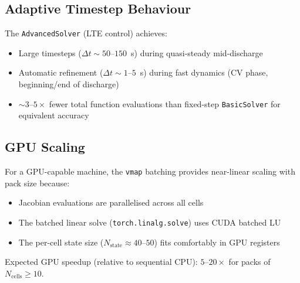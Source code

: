 \subsection{Adaptive Timestep Behaviour}

The \texttt{AdvancedSolver} (LTE control) achieves:
\begin{itemize}
  \item Large timesteps ($\Delta t \sim 50$--$150$~s) during quasi-steady mid-discharge
  \item Automatic refinement ($\Delta t \sim 1$--$5$~s) during fast dynamics (CV phase, beginning/end of discharge)
  \item $\sim 3$--$5\times$ fewer total function evaluations than fixed-step \texttt{BasicSolver} for equivalent accuracy
\end{itemize}

\subsection{GPU Scaling}

For a GPU-capable machine, the \texttt{vmap} batching provides near-linear scaling with pack size because:
\begin{itemize}
  \item Jacobian evaluations are parallelised across all cells
  \item The batched linear solve (\texttt{torch.linalg.solve}) uses CUDA batched LU
  \item The per-cell state size ($N_\text{state} \approx 40$--$50$) fits comfortably in GPU registers
\end{itemize}

Expected GPU speedup (relative to sequential CPU): $5$--$20\times$ for packs of $N_\text{cells} \geq 10$.
